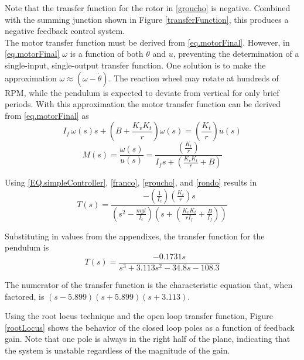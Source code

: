 \documentclass[12pt,letterpaper]{article}
\begin{document}
Note that the transfer function for the rotor in \eqref{groucho} is negative.  Combined with the summing
junction shown in Figure \ref{transferFunction}, this produces a negative feedback control system.\\
 


The motor transfer function must be derived from \eqref{eq.motorFinal}.  However,  in \eqref{eq.motorFinal} $\omega$
is a function of both $\theta$ and $u$, preventing the determination of a single-input, single-output transfer function.  One solution is to make the approximation $\omega \approx (\omega - \dot{\theta})$.  The reaction wheel may rotate at hundreds of RPM, while the pendulum is expected to deviate from vertical for only brief periods.  With this approximation 
the motor transfer function can be derived from \eqref{eq.motorFinal} as
\begin{equation}
    I_{f} \, \omega(s) s + \left( B+\frac{K_{v} K_{t}}{r} \right) \omega(s) = \left(\frac{K_{t}} {r}\right)u(s)
\end{equation}
%
\begin{equation}
    M(s) = \frac{\omega(s)}{u(s)} =  \frac{\left(\frac{K_{t}} {r}\right)}{I_{f} s + (\frac{K_{v} K_{t}}{r}+B)}
    \label{rondo}
\end{equation} 

Using \eqref{EQ.simpleController}, \eqref{franco}, \eqref{groucho}, and \eqref{rondo} results in 
%
\begin{equation}
	T(s) =\frac{-(\frac{1} {I_{c}})(\frac{K_{t}}{r})s}
	{(s^2-\frac{m g l}{I_{c}})(s+(\frac{K_{v} K_{t}}{r I_{f}}+\frac{B}{I_{f}}))}
\end{equation}

Substituting in values from the appendixes, the transfer function for the pendulum is
\begin{equation}
	T(s) =\frac{-0.1731 s}{s^3 + 3.113 s^2 -34.8 s -108.3}
\end{equation}

The numerator of the transfer function is the characteristic equation that, when factored, is
$(s-5.899) (s+5.899) (s+3.113)$.

Using the root locus technique and the open loop transfer function, Figure \ref{rootLocus} shows the
behavior of the closed loop poles as a function of feedback gain.  Note that one pole is always in the right
half of the plane, indicating that the system is unstable regardless of the magnitude of the gain. \\
\end{document}
